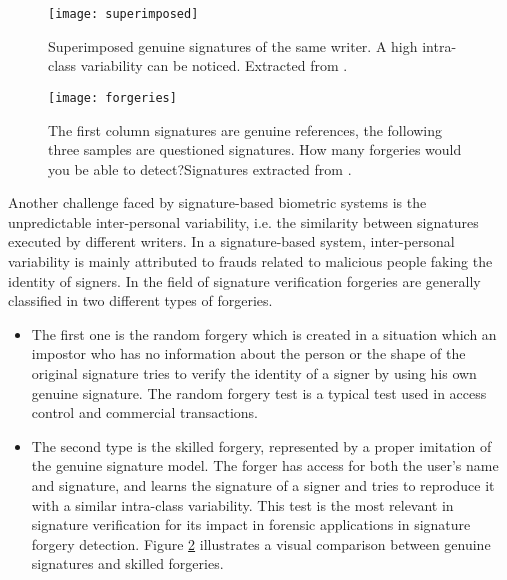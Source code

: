 \begin{figure}[!h]
\centering
\texttt{[image: superimposed]}
\caption{Superimposed genuine signatures of the same writer. A high intra-class variability can be noticed. Extracted from \cite{hafemann2015offline}. }
\label{fig:intraclass}
\end{figure}

\begin{figure}[!htb]
\centering
\texttt{[image: forgeries]}
\caption[The first column signatures are genuine references, the following three samples are questioned signatures. How many forgeries would you be able to detect? Signatures extracted from \cite{mcyt-100}.]{The first column signatures are genuine references, the following three samples are questioned signatures. How many forgeries would you be able to detect?\protect\footnotemark Signatures extracted from \cite{mcyt-100}.} 
\label{fig_forgeries}

\end{figure}

Another challenge faced by signature-based biometric systems is the unpredictable inter-personal variability, i.e. the similarity between signatures executed by different writers. In a signature-based system, inter-personal variability is mainly attributed to frauds related to malicious people faking the identity of signers. In the field of signature verification forgeries are generally classified in two different types of forgeries. 
\begin{itemize}
\item The first one is the random forgery which is created in a situation which an impostor who has no information about the person or the shape of the original signature tries to verify the identity of a signer by using his own genuine signature. The random forgery test is a typical test used in access control and commercial transactions. 

\item The second type is the skilled forgery, represented by a proper imitation of the genuine signature model. The forger has access for both the user’s name and signature, and  learns the signature of a signer and tries to reproduce it with a similar intra-class variability. This test is the most relevant in signature verification for its impact in forensic applications in signature forgery detection. Figure \ref{fig_forgeries} illustrates a visual comparison between genuine signatures and skilled forgeries.
 
\end{itemize}




